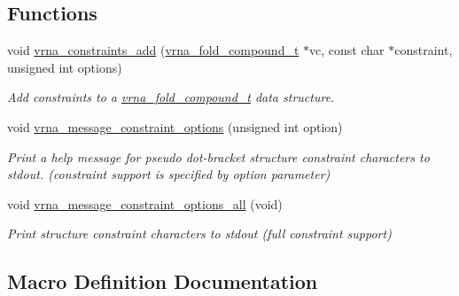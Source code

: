 \subsection*{Functions}
\begin{DoxyCompactItemize}
\item 
void \mbox{\hyperlink{group__constraints_ga35a401f680969a556858a8dd5f1d07cc}{vrna\+\_\+constraints\+\_\+add}} (\mbox{\hyperlink{group__fold__compound_ga1b0cef17fd40466cef5968eaeeff6166}{vrna\+\_\+fold\+\_\+compound\+\_\+t}} $\ast$vc, const char $\ast$constraint, unsigned int options)
\begin{DoxyCompactList}\small\item\em Add constraints to a \mbox{\hyperlink{group__fold__compound_ga1b0cef17fd40466cef5968eaeeff6166}{vrna\+\_\+fold\+\_\+compound\+\_\+t}} data structure. \end{DoxyCompactList}\item 
void \mbox{\hyperlink{group__constraints_gaa1f20b53bf09ac2e6b0dbb13f7d89670}{vrna\+\_\+message\+\_\+constraint\+\_\+options}} (unsigned int option)
\begin{DoxyCompactList}\small\item\em Print a help message for pseudo dot-\/bracket structure constraint characters to stdout. (constraint support is specified by option parameter) \end{DoxyCompactList}\item 
void \mbox{\hyperlink{group__constraints_gaec7e13fa0465c2acc7a621d1aecb709f}{vrna\+\_\+message\+\_\+constraint\+\_\+options\+\_\+all}} (void)
\begin{DoxyCompactList}\small\item\em Print structure constraint characters to stdout (full constraint support) \end{DoxyCompactList}\end{DoxyCompactItemize}


\subsection{Macro Definition Documentation}
\mbox{\label{group__constraints_ga62e0ed0c33002c09423de4e646f85a2b}} 
